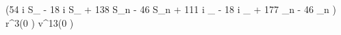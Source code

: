  \left(54 i S_{\lambda} \nu - 18 i S_{\lambda} + 138 S_{n} \nu - 46 S_{n} + 111 i \Sigma_{\lambda} \delta \nu - 18 i \Sigma_{\lambda} \delta + 177 \Sigma_{n} \delta \nu - 46 \Sigma_{n} \delta\right) r^{3}{\left (0 \right )} v^{13}{\left (0 \right )}